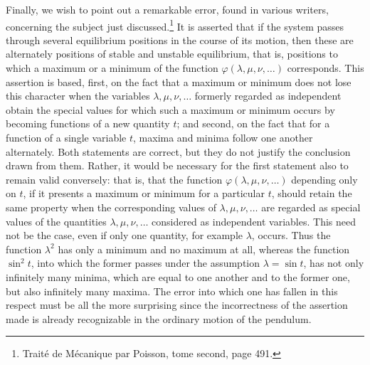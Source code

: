\documentclass[11pt]{article}
\begin{document}
Finally, we wish to point out a remarkable error, found in various writers, concerning the subject just discussed.\footnote{Traité de Mécanique par Poisson, tome second, page 491.} It is asserted that if the system passes through several equilibrium positions in the course of its motion, then these are alternately positions of stable and unstable equilibrium, that is, positions to which a maximum or a minimum of the function $\varphi(\lambda,\mu,\nu,\ldots)$ corresponds. This assertion is based, first, on the fact that a maximum or minimum does not lose this character when the variables $\lambda,\mu,\nu,\ldots$ formerly regarded as independent obtain the special values for which such a maximum or minimum occurs by becoming functions of a new quantity $t$; and second, on the fact that for a function of a single variable $t$, maxima and minima follow one another alternately. Both statements are correct, but they do not justify the conclusion drawn from them. Rather, it would be necessary for the first statement also to remain valid conversely: that is, that the function $\varphi(\lambda,\mu,\nu,\ldots)$ depending only on $t$, if it presents a maximum or minimum for a particular $t$, should retain the same property when the corresponding values of $\lambda,\mu,\nu,\ldots$ are regarded as special values of the quantities $\lambda,\mu,\nu,\ldots$ considered as independent variables. This need not be the case, even if only one quantity, for example $\lambda$, occurs. Thus the function $\lambda^2$ has only a minimum and no maximum at all, whereas the function $\sin^2 t$, into which the former passes under the assumption $\lambda=\sin t$, has not only infinitely many minima, which are equal to one another and to the former one, but also infinitely many maxima. The error into which one has fallen in this respect must be all the more surprising since the incorrectness of the assertion made is already recognizable in the ordinary motion of the pendulum.
\end{document}
